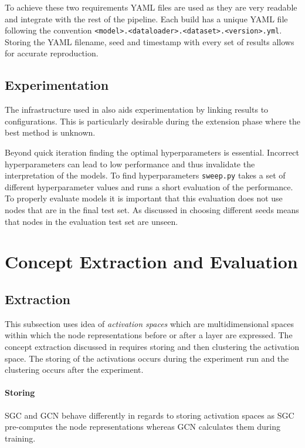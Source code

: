 To achieve these two requirements YAML files are used as they are very readable and integrate with the rest of the pipeline.
Each build has a unique YAML file following the convention \texttt{<model>.<dataloader>.<dataset>.<version>.yml}.
Storing the YAML filename, seed and timestamp with every set of results allows for accurate reproduction.

\subsection{Experimentation}
The infrastructure used in  also aids experimentation by linking results to configurations.
This is particularly desirable during the extension phase where the best method is unknown.

Beyond quick iteration finding the optimal hyperparameters is essential.
Incorrect hyperparameters can lead to low performance and thus invalidate the interpretation of the models.
To find hyperparameters \texttt{sweep.py} takes a set of different hyperparameter values and runs a short evaluation of the performance.
To properly evaluate models it is important that this evaluation does not use nodes that are in the final test set.
As discussed in  choosing different seeds means that nodes in the evaluation test set are unseen.

\section{Concept Extraction and Evaluation}
\label{sec:concepts}

\subsection{Extraction}
\label{sec:extraction}

This subsection uses idea of \emph{activation spaces} which are multidimensional spaces within which the node representations before or after a layer are expressed.
The concept extraction discussed in  requires storing and then clustering the activation space.
The storing of the activations occurs during the experiment run and the clustering occurs after the experiment.

\paragraph{Storing}
SGC and GCN behave differently in regards to storing activation spaces as SGC pre-computes the node representations whereas GCN calculates them during training.

